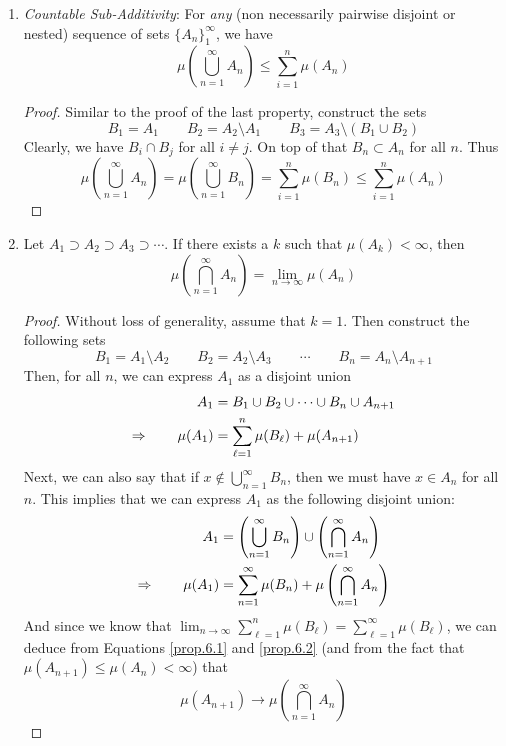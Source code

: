\documentclass[12pt]{article}
\theoremstyle{plain}
\theoremstyle{definition}
\theoremstyle{remark}
\begin{document}
\begin{enumerate}
\item \emph{Countable Sub-Additivity}: For \emph{any} (non necessarily pairwise disjoint or nested) sequence of sets $\{A_n\}_1^\infty$, we have
    \[ 
        \mu\left(\bigcup^\infty_{n=1} A_n\right)
        \leq \sum^n_{i=1} \mu(A_n)
    \]
\begin{proof}
Similar to the proof of the last property, construct the sets
\[
    B_1 = A_1 \qquad B_2 = A_2 \setminus A_1 
    \qquad B_3 = A_3 \setminus (B_1 \cup B_2)
\]
Clearly, we have $B_i \cap B_j$ for all $i\neq j$. On top of that $B_n \subset A_n$ for all $n$. Thus
\[
    \mu\left(\bigcup^\infty_{n=1} A_n\right)
    = \mu\left(\bigcup^\infty_{n=1} B_n\right)
    = \sum^n_{i=1}\mu(B_n) 
    \leq \sum^n_{i=1} \mu(A_n)
\]
\end{proof}


\item Let $A_1 \supset A_2 \supset A_3 \supset \cdots$. If there exists a $k$ such that $\mu(A_k)<\infty$, then 
    \[
        \mu\left(\bigcap^\infty_{n=1} A_n\right)
        = \lim_{n\rightarrow\infty} \mu(A_n)
    \]
\begin{proof}
Without loss of generality, assume that $k=1$. Then construct the following sets
\[
    B_1 = A_1 \setminus A_2 \qquad
    B_2 = A_2 \setminus A_3 \qquad
    \cdots\qquad
    B_n = A_n \setminus A_{n+1} 
\]
Then, for all $n$, we can express $A_1$ as a disjoint union
\begin{align}
    A_1 &= B_1 \cup B_2 \cup \cdots \cup B_n
    \cup A_{n+1} \notag\\
    \Rightarrow \qquad 
    \mu(A_1) &= \sum^n_{\ell=1} \mu(B_\ell) + 
    \mu(A_{n+1}) \label{prop.6.1}
\end{align}
Next, we can also say that if $x\not\in \bigcup^\infty_{n=1} B_n$, then we must have $x\in A_n$ for all $n$. This implies that we can express $A_1$ as the following disjoint union:
\begin{align}
    A_1 &= \left(\bigcup^\infty_{n=1} B_n \right)\cup 
        \left(\bigcap^\infty_{n=1} A_n\right) \notag \\
    \Rightarrow \qquad 
        \mu(A_1) &= 
        \sum^\infty_{n=1} \mu(B_n) +
        \mu\left(\bigcap^\infty_{n=1} A_n\right) 
        \label{prop.6.2}
\end{align}
And since we know that $\lim_{n\rightarrow \infty} \sum^n_{\ell=1} \mu(B_\ell) = \sum^\infty_{\ell=1} \mu(B_\ell)$, we can deduce from Equations \ref{prop.6.1} and \ref{prop.6.2} (and from the fact that $\mu(A_{n+1}) \leq \mu(A_n) <\infty$) that 
\[ \mu(A_{n+1})\rightarrow 
    \mu\left(\bigcap^\infty_{n=1} A_n\right)
\]
\end{proof}
\end{enumerate}
\end{document}
